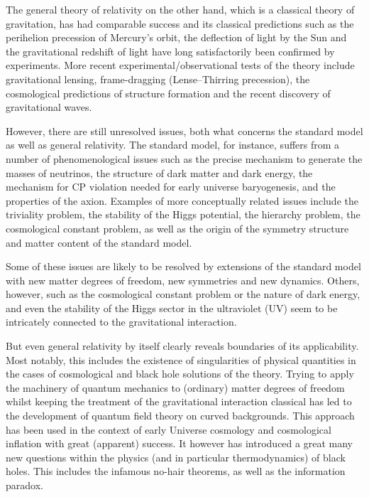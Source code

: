 \documentclass[11pt]{book}
\numberwithin{equation}{chapter}
\begin{document}
The general theory of relativity on the other hand, which is a classical theory of gravitation,
has had comparable success and its
classical predictions such as the perihelion precession of Mercury's orbit, the deflection of light by the Sun
and the gravitational redshift of light have long satisfactorily been confirmed by experiments.
More recent experimental/observational tests of the theory include gravitational lensing,
frame-dragging (Lense–Thirring precession),
the cosmological predictions of structure formation
and the recent discovery of gravitational waves.

However, there are still unresolved issues, both what concerns the standard model as well
as general relativity.
The standard model, for instance, suffers from a number of phenomenological issues such as
the precise mechanism to generate the masses of neutrinos,
the structure of dark matter and dark energy,
the mechanism for CP violation needed for early universe baryogenesis,
and the properties of the axion.
Examples of more conceptually related issues include the triviality problem,
the stability of the Higgs potential,
the hierarchy problem,
the cosmological constant problem,
as well as
the origin of the symmetry structure and matter content of the standard model.

Some of these issues are likely to be resolved by extensions of the standard model
with new matter degrees of freedom, new symmetries and new dynamics. Others, however,
such as the cosmological constant problem or the nature of dark energy,
and even the stability of the Higgs sector
in the ultraviolet (UV) seem to be intricately connected to the gravitational interaction.

But even general relativity by itself clearly reveals boundaries of its applicability.
Most notably, this includes the existence of singularities of physical quantities
in the cases of cosmological and black hole solutions of the theory.
Trying to apply the machinery of quantum mechanics to (ordinary) matter degrees of freedom
whilst keeping the treatment of the gravitational interaction classical has led
to the development of quantum field theory on curved backgrounds. This approach has
been used in the context of early Universe cosmology and cosmological inflation with
great (apparent) success. It however has introduced a great many new questions within
the physics (and in particular thermodynamics) of black holes. This includes the
infamous no-hair theorems, as well as the information paradox.
\end{document}
